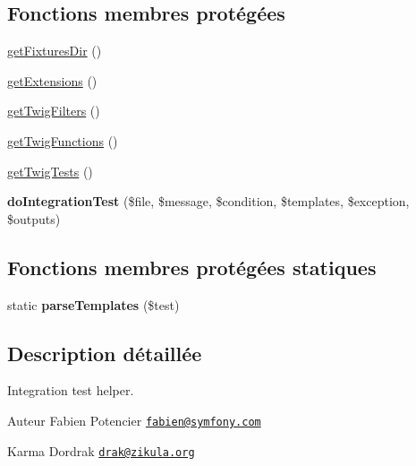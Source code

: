 \subsection*{Fonctions membres protégées}
\begin{DoxyCompactItemize}
\item 
\hyperlink{class_twig___test___integration_test_case_a497128a4b6ea4dae7ab2be44290823aa}{get\+Fixtures\+Dir} ()
\item 
\hyperlink{class_twig___test___integration_test_case_a0bf1cdb692f876fae6acd2bfbb548244}{get\+Extensions} ()
\item 
\hyperlink{class_twig___test___integration_test_case_a724a37175499ba72760313db3738b781}{get\+Twig\+Filters} ()
\item 
\hyperlink{class_twig___test___integration_test_case_ac39a609263248d3abebb1e1d54e3a843}{get\+Twig\+Functions} ()
\item 
\hyperlink{class_twig___test___integration_test_case_afc6154eb772243e58f886cece83d75b8}{get\+Twig\+Tests} ()
\item 
{\bfseries do\+Integration\+Test} (\$file, \$message, \$condition, \$templates, \$exception, \$outputs)\hypertarget{class_twig___test___integration_test_case_a2c3fbdae4704e24e582a643599710d36}{}\label{class_twig___test___integration_test_case_a2c3fbdae4704e24e582a643599710d36}

\end{DoxyCompactItemize}
\subsection*{Fonctions membres protégées statiques}
\begin{DoxyCompactItemize}
\item 
static {\bfseries parse\+Templates} (\$test)\hypertarget{class_twig___test___integration_test_case_aa60b8234188dd82775c897e67d64a10b}{}\label{class_twig___test___integration_test_case_aa60b8234188dd82775c897e67d64a10b}

\end{DoxyCompactItemize}


\subsection{Description détaillée}
Integration test helper.

\begin{DoxyAuthor}{Auteur}
Fabien Potencier \href{mailto:fabien@symfony.com}{\tt fabien@symfony.\+com} 

Karma Dordrak \href{mailto:drak@zikula.org}{\tt drak@zikula.\+org} 
\end{DoxyAuthor}


